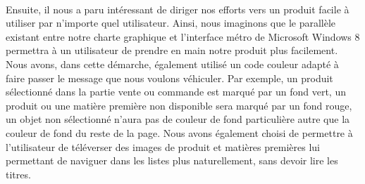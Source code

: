     \paragraph{}
        Ensuite, il nous a paru intéressant de diriger nos efforts vers un
        produit facile à utiliser par n'importe quel utilisateur.
        Ainsi, nous imaginons que le parallèle existant entre notre charte
        graphique et l'interface métro de Microsoft Windows 8 permettra à un
        utilisateur de prendre en main notre produit plus facilement.
        Nous avons, dans cette démarche, également utilisé un code couleur
        adapté à faire passer le message que nous voulons véhiculer.
        Par exemple, un produit sélectionné dans la partie vente ou commande
        est marqué par un fond vert, un produit ou une matière première non
        disponible sera marqué par un fond rouge, un objet non sélectionné
        n'aura pas de couleur de fond particulière autre que la couleur de fond
        du reste de la page.
        Nous avons également choisi de permettre à l'utilisateur de téléverser
        des images de produit et matières premières lui permettant de naviguer
        dans les listes plus naturellement, sans devoir lire les titres.
